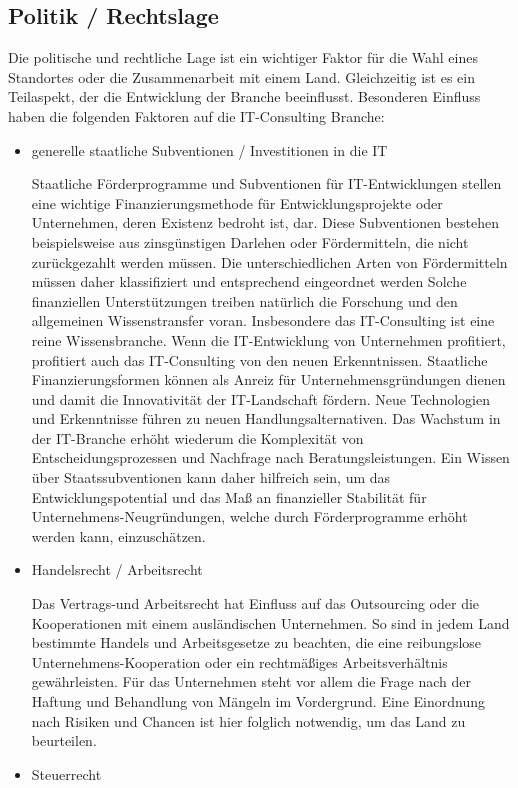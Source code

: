 \subsection{Politik / Rechtslage}
Die politische und rechtliche Lage ist ein wichtiger Faktor für die Wahl eines Standortes oder die Zusammenarbeit mit einem Land. Gleichzeitig ist es ein Teilaspekt, der die Entwicklung der Branche beeinflusst.
Besonderen Einfluss haben die folgenden Faktoren auf die IT-Consulting Branche:
\begin{itemize} 
\item {generelle staatliche Subventionen / Investitionen in die IT}

 Staatliche Förderprogramme und Subventionen für IT-Entwicklungen stellen eine wichtige Finanzierungsmethode für Entwicklungsprojekte oder Unternehmen, deren Existenz bedroht ist, dar. Diese Subventionen bestehen beispielsweise aus zinsgünstigen Darlehen oder Fördermitteln, die nicht zurückgezahlt werden müssen. Die unterschiedlichen Arten von Fördermitteln müssen daher klassifiziert und entsprechend eingeordnet werden
 Solche finanziellen Unterstützungen treiben natürlich die Forschung und den allgemeinen Wissenstransfer voran. Insbesondere das IT-Consulting ist eine reine Wissensbranche. Wenn die IT-Entwicklung von Unternehmen profitiert, profitiert auch das IT-Consulting von den neuen Erkenntnissen. 
 Staatliche Finanzierungsformen können als Anreiz für Unternehmensgründungen dienen und damit die Innovativität der IT-Landschaft fördern. Neue Technologien und Erkenntnisse führen zu neuen Handlungsalternativen. Das Wachstum in der IT-Branche erhöht wiederum die Komplexität von Entscheidungsprozessen und Nachfrage nach Beratungsleistungen.
Ein Wissen über Staatssubventionen kann daher hilfreich sein, um das Entwicklungspotential und das Maß an finanzieller Stabilität für Unternehmens-Neugründungen, welche durch Förderprogramme erhöht werden kann, einzuschätzen.
 \\
\item  {Handelsrecht / Arbeitsrecht}

 Das Vertrags-und Arbeitsrecht hat Einfluss auf das Outsourcing oder die Kooperationen mit einem ausländischen Unternehmen. 
 So sind in jedem Land bestimmte Handels und Arbeitsgesetze zu beachten, die eine reibungslose Unternehmens-Kooperation oder ein rechtmäßiges Arbeitsverhältnis gewährleisten. 
Für das Unternehmen steht vor allem die Frage nach der Haftung und Behandlung von Mängeln im Vordergrund. 
Eine Einordnung nach Risiken und Chancen ist hier folglich notwendig, um das Land zu beurteilen. 
 \\
\item {Steuerrecht}


\end{itemize}
